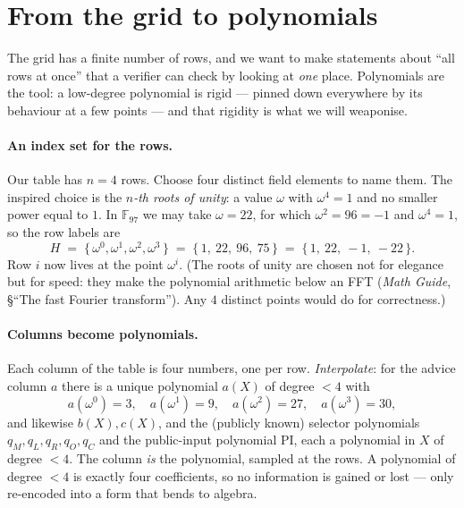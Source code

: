 \documentclass[11pt,a4paper]{article}
\theoremstyle{definition}
\newcommand{\F}{\mathbb{F}}
\begin{document}
\section{From the grid to polynomials}\label{sec:polys}

The grid has a finite number of rows, and we want to make statements about
``all rows at once'' that a verifier can check by looking at \emph{one} place.
Polynomials are the tool: a low-degree polynomial is rigid --- pinned down
everywhere by its behaviour at a few points --- and that rigidity is what we
will weaponise.

\paragraph{An index set for the rows.} Our table has $n = 4$ rows. Choose four
distinct field elements to name them. The inspired choice is the
\emph{$n$-th roots of unity}: a value $\omega$ with $\omega^4 = 1$ and no
smaller power equal to $1$. In $\F_{97}$ we may take $\omega = 22$, for which
$\omega^2 = 96 = -1$ and $\omega^4 = 1$, so the row labels are
\[
H \;=\; \{\,\omega^0, \omega^1, \omega^2, \omega^3\,\}
   \;=\; \{\,1,\ 22,\ 96,\ 75\,\}
   \;=\; \{\,1,\ 22,\ -1,\ -22\,\}.
\]
Row $i$ now lives at the point $\omega^i$. (The roots of unity are chosen not
for elegance but for speed: they make the polynomial arithmetic below an FFT
(\emph{Math Guide}, \S``The fast Fourier transform''). Any $4$ distinct
points would do for correctness.)

\paragraph{Columns become polynomials.} Each column of the table is four
numbers, one per row. \emph{Interpolate}: for the advice column $a$ there is a
unique polynomial $a(X)$ of degree $< 4$ with
\[
a(\omega^0) = 3,\quad a(\omega^1) = 9,\quad a(\omega^2) = 27,\quad a(\omega^3) = 30,
\]
and likewise $b(X), c(X)$, and the (publicly known) selector polynomials
$q_M, q_L, q_R, q_O, q_C$ and the public-input polynomial $\mathrm{PI}$, each a
polynomial in $X$ of degree $< 4$. The column \emph{is} the polynomial, sampled at the rows.
A polynomial of degree $< 4$ is exactly four coefficients, so no information is
gained or lost --- only re-encoded into a form that bends to algebra.
\end{document}

